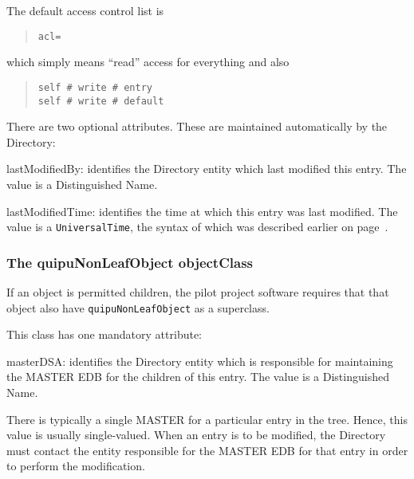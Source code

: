 The default access control list is
\begin{quote}\small\begin{verbatim}
acl=
\end{verbatim}\end{quote}
which simply means ``read'' access for everything and also
\begin{quote}\small\begin{verbatim}
self # write # entry
self # write # default
\end{verbatim}\end{quote}

There are two optional attributes.
These are maintained automatically by the Directory:
\begin{describe}
\item[lastModifiedBy:]
			identifies the Directory entity which last modified
			this entry.
			The value is a Distinguished Name.

\item[lastModifiedTime:]
			identifies the time at which this entry was last
			modified.
			The value is a \verb"UniversalTime",
			the syntax of which was described earlier on
			page~\pageref{UniversalTime}.
\end{describe}

\subsubsection	{The quipuNonLeafObject objectClass}
If an object is permitted children,
the pilot project software requires that that object also have
\verb"quipuNonLeafObject" as a superclass.

This class has one mandatory attribute:
\begin{describe}
\item[masterDSA:]
			identifies the Directory entity which is responsible
			for maintaining the MASTER EDB for the children of
			this entry.
			The value is a Distinguished Name.
\end{describe}
There is typically a single MASTER for a particular entry in the tree.
Hence, this value is usually single-valued.
When an entry is to be modified,
the Directory must contact the entity responsible for the MASTER EDB for
that entry in order to perform the modification.


